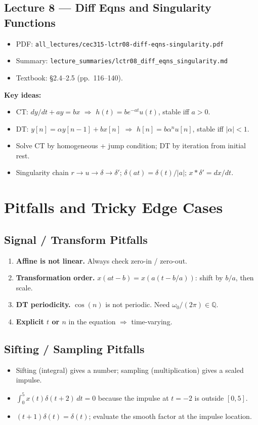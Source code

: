 \documentclass[11pt]{article}
\newcommand{\Conv}{\ast}
\begin{document}
\subsection{Lecture 8 --- Diff Eqns and Singularity Functions}
\begin{itemize}[leftmargin=*]
  \item PDF: \texttt{all\_lectures/cec315-lctr08-diff-eqns-singularity.pdf}
  \item Summary: \texttt{lecture\_summaries/lctr08\_diff\_eqns\_singularity.md}
  \item Textbook: \S 2.4--2.5 (pp.~116--140).
\end{itemize}
\textbf{Key ideas:}
\begin{itemize}[leftmargin=*]
  \item CT: $dy/dt+ay=bx$ $\Rightarrow$ $h(t)=be^{-at}u(t)$, stable iff $a>0$.
  \item DT: $y[n]=\alpha y[n-1]+bx[n]$ $\Rightarrow$ $h[n]=b\alpha^n u[n]$, stable iff $|\alpha|<1$.
  \item Solve CT by homogeneous + jump condition; DT by iteration from initial rest.
  \item Singularity chain $r\to u\to\delta\to\delta'$; $\delta(at)=\delta(t)/|a|$; $x\Conv\delta'=dx/dt$.
\end{itemize}

\section{Pitfalls and Tricky Edge Cases}

\subsection{Signal / Transform Pitfalls}
\begin{enumerate}[leftmargin=*]
  \item \textbf{Affine is not linear.} Always check zero-in / zero-out.
  \item \textbf{Transformation order.} $x(at-b) = x(a(t-b/a))$: shift by $b/a$, then scale.
  \item \textbf{DT periodicity.} $\cos(n)$ is not periodic. Need $\omega_0/(2\pi)\in\mathbb{Q}$.
  \item \textbf{Explicit $t$ or $n$} in the equation $\Rightarrow$ time-varying.
\end{enumerate}

\subsection{Sifting / Sampling Pitfalls}
\begin{itemize}[leftmargin=*]
  \item Sifting (integral) gives a number; sampling (multiplication) gives a scaled impulse.
  \item $\int_0^5 x(t)\delta(t+2)\,dt = 0$ because the impulse at $t=-2$ is outside $[0,5]$.
  \item $(t+1)\delta(t) = \delta(t)$; evaluate the smooth factor at the impulse location.
\end{itemize}
\end{document}
